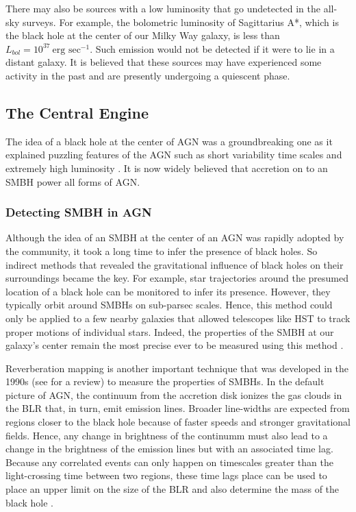 There may also be sources with a low luminosity that go undetected in the all-sky surveys. For example, the bolometric luminosity of Sagittarius A*, which is the black hole at the center of our Milky Way galaxy, is less than $L_{bol}=10^{37}~\textrm{erg sec}^{-1}$. Such emission would not be detected if it were to lie in a distant galaxy. It is believed that these sources may have experienced some activity in the past and are presently undergoing a quiescent phase.

\subsection{The Central Engine \label{sec:engine}}
The idea of a black hole at the center of AGN was a groundbreaking one as it explained puzzling features of the AGN such as short variability time scales and extremely high luminosity \citep{salpeter1964accretion,zel1964estimating,lynden1969galactic}. It is now widely believed that accretion on to an SMBH power all forms of AGN. 


\subsubsection{Detecting SMBH in AGN}
Although the idea of an SMBH at the center of an AGN was rapidly adopted by the community, it took a long time to infer the presence of black holes. So indirect methods that revealed the gravitational influence of black holes on their surroundings became the key. For example, star trajectories around the presumed location of a black hole can be monitored to infer its presence. However, they typically orbit around SMBHs on sub-parsec scales. Hence, this method could only be applied to a few nearby galaxies that allowed telescopes like HST to track proper motions of individual stars. Indeed, the properties of the SMBH at our galaxy's center remain the most precise ever to be measured using this method \citep{2008ApJ...689.1044G}.

Reverberation mapping is another important technique that was developed in the 1990s (see \citet{Peterson2004} for a review) to measure the properties of SMBHs. In the default picture of AGN, the continuum from the accretion disk ionizes the gas clouds in the BLR that, in turn, emit emission lines. Broader line-widths are expected from regions closer to the black hole because of faster speeds and stronger gravitational fields. Hence, any change in brightness of the continumm must also lead to a change in the brightness of the emission lines but with an associated time lag. Because any correlated events can only happen on timescales greater than the light-crossing time between two regions, these time lags place can be used to place an upper limit on the size of the BLR and also determine the mass of the black hole \citep{Peterson2004}. 

